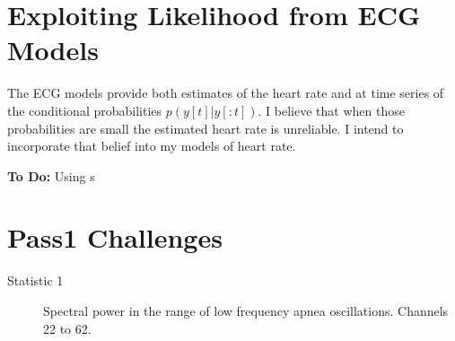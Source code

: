\documentclass[12pt]{article}
\begin{document}
\section{Exploiting Likelihood from ECG Models}
\label{sec:exploit_likelihood}

The ECG models provide both estimates of the heart rate and at time
series of the conditional probabilities $p(y[t]|y[:t])$.  I believe
that when those probabilities are small the estimated heart rate is
unreliable.  I intend to incorporate that belief into my models of
heart rate.

\textbf{To Do:} Using s

\section{Pass1 Challenges}
\label{sec:pass1}

\begin{description}
\item[Statistic 1] Spectral power in the range of low frequency apnea
        oscillations.  Channels 22 to 62.
\end{description}
\end{document}
